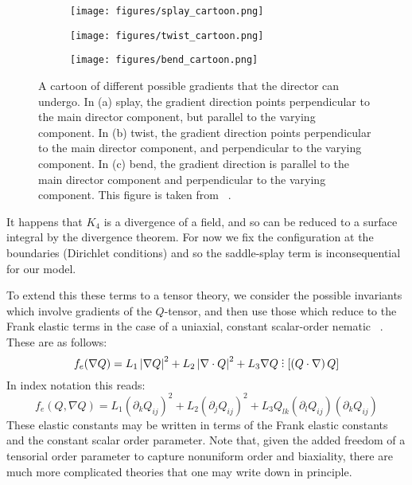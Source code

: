 \documentclass[reqno]{article}
\DeclareRobustCommand{\divby}{%
  \mathrel{\vbox{\baselineskip.65ex\lineskiplimit0pt\hbox{.}\hbox{.}\hbox{.}}}%
}
\begin{document}
  \begin{figure}[h]
    \centering
    \begin{subfigure}{0.45\textwidth}
      \texttt{[image: figures/splay\_cartoon.png]}
      \caption{}
      \label{fig:splay-cartoon}
    \end{subfigure}
    \hfill
    \begin{subfigure}{0.45\textwidth}
      \texttt{[image: figures/twist\_cartoon.png]}
      \caption{}
      \label{fig:twist-cartoon}
    \end{subfigure}
    \hfill
    \begin{subfigure}{0.45\textwidth}
      \texttt{[image: figures/bend\_cartoon.png]}
      \caption{}
      \label{fig:bend-cartoon}
    \end{subfigure}
    \caption{A cartoon of different possible gradients that the director can
      undergo. In (a) splay, the gradient direction points perpendicular to the
      main director component, but parallel to the varying component. In (b)
      twist, the gradient direction points perpendicular to the main director
      component, and perpendicular to the varying component. In (c) bend, the
      gradient direction is parallel to the main director component and
      perpendicular to the varying component. This figure is taken from
      ~\cite{selinger_introduction_2016}.}
    \label{fig:deformation-cartoon}
  \end{figure}
  It happens that $K_4$ is a divergence of a field, and so can be reduced to a
  surface integral by the divergence theorem.
  For now we fix the configuration at the boundaries (Dirichlet conditions) and
  so the saddle-splay term is inconsequential for our model.

  To extend this these terms to a tensor theory, we consider the possible
  invariants which involve gradients of the $Q$-tensor, and then use those which
  reduce to the Frank elastic terms in the case of a uniaxial, constant
  scalar-order nematic ~\cite{mottram_introduction_2014}.
  These are as follows:
  \begin{equation} \label{eq:elastic-free-energy}
    f_e (\nabla Q)
    = L_1 \left| \nabla Q \right|^2
    + L_2 \left| \nabla \cdot Q \right|^2
    + L_3 \nabla Q  \divby \left[ \left( Q \cdot \nabla \right) Q \right]
  \end{equation}
  In index notation this reads:
  \begin{equation}
    f_e (Q, \nabla Q)
    =
    L_1 \left( \partial_k Q_{ij} \right)^2
    + L_2 \left( \partial_j Q_{ij} \right)^2
    + L_3 Q_{lk} \left( \partial_{l} Q_{ij} \right) \left( \partial_k Q_{ij} \right)
  \end{equation}
  These elastic constants may be written in terms of the Frank elastic constants
  and the constant scalar order parameter.
  Note that, given the added freedom of a tensorial order parameter to capture
  nonuniform order and biaxiality, there are much more complicated theories that
  one may write down in principle.
  
\end{document}
